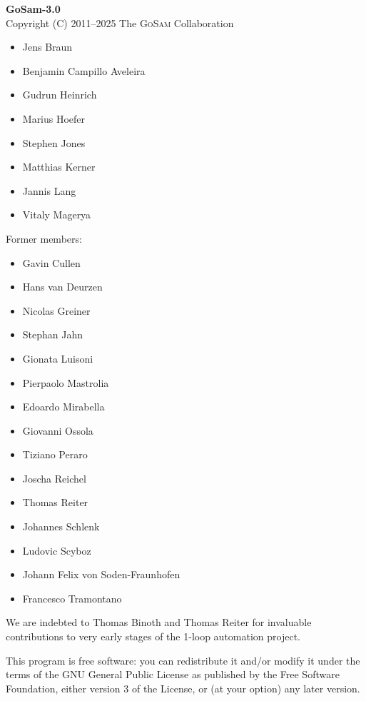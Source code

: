 \documentclass[11pt,a4paper, oneside]{scrbook}
\newcommand{\gosam}{\textsc{GoSam}\xspace}
\begin{document}
    \textbf{GoSam-3.0}  \\
    Copyright (C) 2011--2025  The \gosam Collaboration
   \begin{itemize}         
      \setlength\itemsep{-0.5em}
      \item Jens Braun
      \item Benjamin Campillo Aveleira      
      \item Gudrun Heinrich                  
      \item Marius Hoefer
      \item Stephen Jones
      \item Matthias Kerner
      \item Jannis Lang
      \item Vitaly Magerya

   \end{itemize}

    Former members:
    \begin{itemize}
      \setlength\itemsep{-0.5em}
      \item Gavin Cullen
      \item Hans van Deurzen
      \item Nicolas Greiner
      \item Stephan Jahn
      \item Gionata Luisoni
      \item Pierpaolo Mastrolia
      \item Edoardo Mirabella
      \item Giovanni Ossola
		\item Tiziano Peraro
      \item Joscha Reichel
		\item Thomas Reiter
		\item Johannes Schlenk
		\item Ludovic Scyboz
		\item Johann Felix von Soden-Fraunhofen
      \item Francesco Tramontano
    \end{itemize}
   
    We are indebted to Thomas Binoth and Thomas Reiter for invaluable contributions 
    to very early stages of the 1-loop automation project.
 
    This program is free software: you can redistribute it and/or modify
    it under the terms of the GNU General Public License as published by
    the Free Software Foundation, either version 3 of the License, or
    (at your option) any later version.
\end{document}
